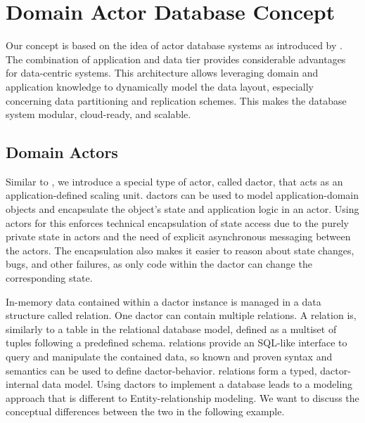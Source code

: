 
\section{Domain Actor Database Concept}\label{sec:concept}
  Our concept is based on the idea of actor database systems as introduced by \citet{manifesto}.
  The combination of application and data tier provides considerable advantages for data-centric systems.
  This architecture allows leveraging domain and application knowledge to dynamically model the data layout, especially concerning data partitioning and replication schemes.
  This makes the database system modular, cloud-ready, and scalable.

  \subsection{Domain Actors}\label{sec:dactors}
    Similar to \citet{Shah:reactdb}, we introduce a special type of actor, called \gls{dactor}, that acts as an application-defined scaling unit.
    \Glspl{dactor} can be used to model application-domain objects and encapsulate the object's state and application logic in an actor.
    Using actors for this enforces technical encapsulation of state access due to the purely private state in actors and the need of explicit asynchronous messaging between the actors.
    The encapsulation also makes it easier to reason about state changes, bugs, and other failures, as only code within the \gls{dactor} can change the corresponding state.

    In-memory data contained within a \gls{dactor} instance is managed in a data structure called \gls{relation}.
    One \gls{dactor} can contain multiple \glspl{relation}.
    A \gls{relation} is, similarly to a table in the relational database model, defined as a multiset of tuples following a predefined schema.
    \Glspl{relation} provide an SQL-like interface to query and manipulate the contained data, so known and proven syntax and semantics can be used to define \gls{dactor}-behavior.
    \Glspl{relation} form a typed, \gls{dactor}-internal data model.
    Using \glspl{dactor} to implement a database leads to a modeling approach that is different to Entity-relationship modeling.
    We want to discuss the conceptual differences between the two in the following example.

